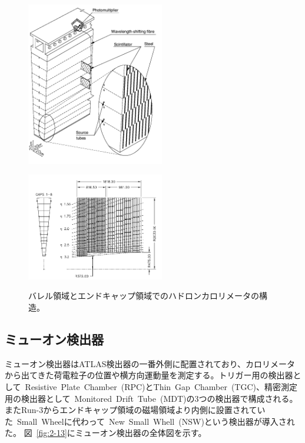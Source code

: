 \begin{figure}[h]
  \begin{minipage}[b]{0.45\linewidth}
      \centering
      \includegraphics[clip, width=6cm]{fig/2/TileCalo.png}
      \label{fig:2-12-1}
  \end{minipage}
    \begin{minipage}[b]{0.45\linewidth}
      \centering
      \includegraphics[clip, width=6cm]{fig/2/HadronEndcapCal.png}
      \label{fig:2-12-2}
  \end{minipage}
  \caption{バレル領域とエンドキャップ領域でのハドロンカロリメータの構造\cite{Aad:1129811}。}
\end{figure}


\subsection{ミューオン検出器}\label{section2-2-5}
ミューオン検出器はATLAS検出器の一番外側に配置されており、カロリメータから出てきた荷電粒子の位置や横方向運動量を測定する。トリガー用の検出器として~Resistive~Plate~Chamber~(RPC)とThin~Gap~Chamber~(TGC)、精密測定用の検出器として~Monitored~Drift~Tube~(MDT)の3つの検出器で構成される。またRun-3からエンドキャップ領域の磁場領域より内側に設置されていた~Small~Wheelに代わって~New~Small~Whell~(NSW)という検出器が導入された。
図~\ref{fig:2-13}にミューオン検出器の全体図を示す。

